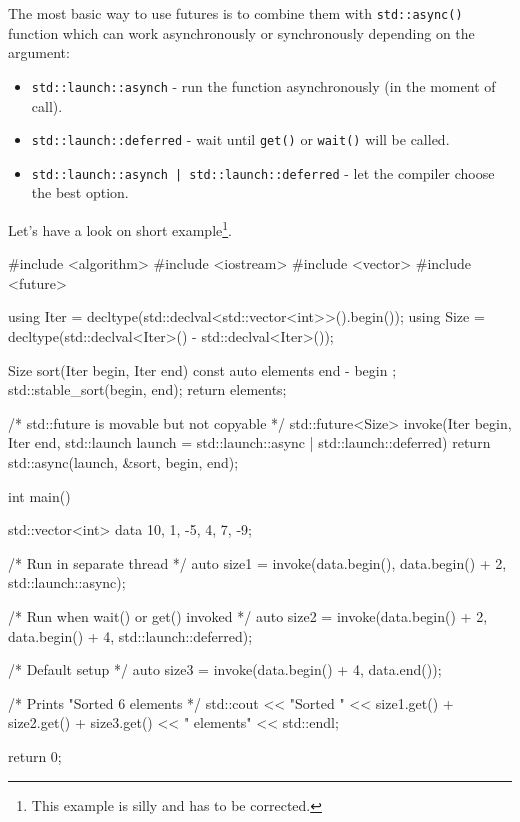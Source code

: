 \documentclass[../main]{subfiles}
\begin{document}
    The most basic way to use futures is to combine them with \texttt{std::async()} function which can work asynchronously or
synchronously depending on the argument:
\begin{itemize}
    \item \texttt{std::launch::asynch} - run the function asynchronously (in the moment of call).
    \item \texttt{std::launch::deferred} - wait until \texttt{get()} or \texttt{wait()} will be called.
    \item \texttt{std::launch::asynch | std::launch::deferred} - let the compiler choose the best option.
\end{itemize}
    Let's have a look on short example\footnote{This example is silly and has to be corrected.}.
\begin{Code}
    #include <algorithm>
    #include <iostream>
    #include <vector>
    #include <future>

    using Iter = decltype(std::declval<std::vector<int>>().begin());
    using Size = decltype(std::declval<Iter>() - std::declval<Iter>());

    Size sort(Iter begin, Iter end)
    {
        const auto elements { end - begin };
        std::stable_sort(begin, end);
        return elements;
    }

    /* std::future is movable but not copyable */
    std::future<Size> invoke(Iter begin, Iter end,
        std::launch launch = std::launch::async | std::launch::deferred)
    {
        return std::async(launch, &sort, begin, end);
    }

    int main()
    {
        std::vector<int> data {10, 1, -5, 4, 7, -9};

        /* Run in separate thread */
        auto size1 = invoke(data.begin(), data.begin() + 2,
            std::launch::async);

        /* Run when wait() or get() invoked */
        auto size2 = invoke(data.begin() + 2, data.begin() + 4,
            std::launch::deferred);

        /* Default setup */
        auto size3 = invoke(data.begin() + 4, data.end());

        /* Prints "Sorted 6 elements */
        std::cout << "Sorted " << size1.get() + size2.get() + size3.get()
                  << " elements" << std::endl;

        return 0;
    }
\end{Code}
\end{document}
